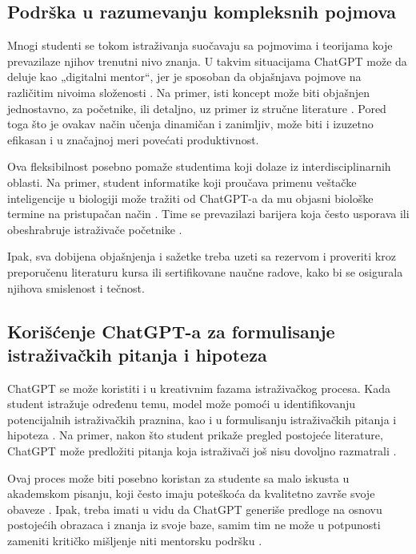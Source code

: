 \documentclass[12pt]{article}
\begin{document}
\subsection{Podrška u razumevanju kompleksnih pojmova}
Mnogi studenti se tokom istraživanja suočavaju sa pojmovima i teorijama koje prevazilaze njihov trenutni nivo znanja. U takvim situacijama ChatGPT može da deluje kao „digitalni mentor“, jer je sposoban da objašnjava pojmove na različitim nivoima složenosti \cite{alsaedi2024chatgpt, mahapatra2024impact}. Na primer, isti koncept može biti objašnjen jednostavno, za početnike, ili detaljno, uz primer iz stručne literature \cite{montenegro2023impact}. Pored toga što je ovakav način učenja dinamičan i zanimljiv, može biti i izuzetno efikasan i u značajnoj meri povećati produktivnost.

Ova fleksibilnost posebno pomaže studentima koji dolaze iz interdisciplinarnih oblasti. Na primer, student informatike koji proučava primenu veštačke inteligencije u biologiji može tražiti od ChatGPT-a da mu objasni biološke termine na pristupačan način \cite{zakova2025exploring}. Time se prevazilazi barijera koja često usporava ili obeshrabruje istraživače početnike \cite{petrovska2024chatgpt}.

Ipak, sva dobijena objašnjenja i sažetke treba uzeti sa rezervom i proveriti kroz preporučenu literaturu kursa ili sertifikovane naučne radove, kako bi se osigurala njihova smislenost i tečnost. 

\subsection{Korišćenje ChatGPT-a za formulisanje istraživačkih pitanja i hipoteza}
ChatGPT se može koristiti i u kreativnim fazama istraživačkog procesa. Kada student istražuje određenu temu, model može pomoći u identifikovanju potencijalnih istraživačkih praznina, kao i u formulisanju istraživačkih pitanja i hipoteza \cite{montenegro2023impact, zakova2025exploring}. Na primer, nakon što student prikaže pregled postojeće literature, ChatGPT može predložiti pitanja koja istraživači još nisu dovoljno razmatrali \cite{petrovska2024chatgpt}.

Ovaj proces može biti posebno koristan za studente sa malo iskusta u akademskom pisanju, koji često imaju poteškoća da kvalitetno završe svoje obaveze \cite{alsaedi2024chatgpt}. Ipak, treba imati u vidu da ChatGPT generiše predloge na osnovu postojećih obrazaca i znanja iz svoje baze, samim tim ne može u potpunosti zameniti kritičko mišljenje niti mentorsku podršku \cite{oliveira2025humanai}.
\end{document}
